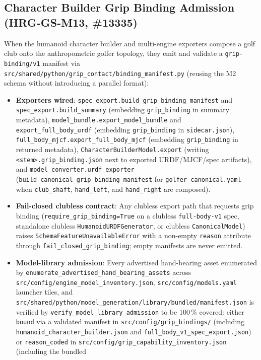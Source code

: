 \documentclass[11pt,a4paper]{article}
\begin{document}
\subsection{Character Builder Grip Binding Admission (HRG-GS-M13, \#13335)}
When the humanoid character builder and multi-engine exporters compose a golf
club onto the anthropometric golfer topology, they emit and validate a
\texttt{grip-binding/v1} manifest via
\texttt{src/shared/python/grip\_contact/binding\_manifest.py} (reusing the M2
schema without introducing a parallel format):
\begin{itemize}
\item \textbf{Exporters wired}: \texttt{spec\_export.build\_grip\_binding\_manifest}
and \texttt{spec\_export.build\_summary} (embedding \texttt{grip\_binding} in
summary metadata), \texttt{model\_bundle.export\_model\_bundle} and
\texttt{export\_full\_body\_urdf} (embedding \texttt{grip\_binding} in
\texttt{sidecar.json}), \texttt{full\_body\_mjcf.export\_full\_body\_mjcf}
(embedding \texttt{grip\_binding} in returned metadata),
\texttt{CharacterBuilderModel.export} (writing \texttt{<stem>.grip\_binding.json}
next to exported URDF/MJCF/spec artifacts), and
\texttt{model\_converter.urdf\_exporter} (\texttt{build\_canonical\_grip\_binding\_manifest}
for \texttt{golfer\_canonical.yaml} when \texttt{club\_shaft}, \texttt{hand\_left},
and \texttt{hand\_right} are composed).
\item \textbf{Fail-closed clubless contract}: Any clubless export path that
requests grip binding (\texttt{require\_grip\_binding=True} on a clubless
\texttt{full-body-v1} spec, standalone clubless \texttt{HumanoidURDFGenerator},
or clubless \texttt{CanonicalModel}) raises
\texttt{SchemaFeatureUnavailableError} with a non-empty \texttt{reason}
attribute through \texttt{fail\_closed\_grip\_binding}; empty manifests are
never emitted.
\item \textbf{Model-library admission}: Every advertised hand-bearing asset
enumerated by \texttt{enumerate\_advertised\_hand\_bearing\_assets} across
\texttt{src/config/engine\_model\_inventory.json}, \texttt{src/config/models.yaml}
launcher tiles, and \texttt{src/shared/python/model\_generation/library/bundled/manifest.json}
is verified by \texttt{verify\_model\_library\_admission} to be 100\,\% covered:
either \texttt{bound} via a validated manifest in
\texttt{src/config/grip\_bindings/} (including
\texttt{humanoid\_character\_builder.json} and
\texttt{full\_body\_v1\_spec\_export.json}) or \texttt{reason\_coded} in
\texttt{src/config/grip\_capability\_inventory.json} (including the bundled

\end{itemize}
\end{document}
